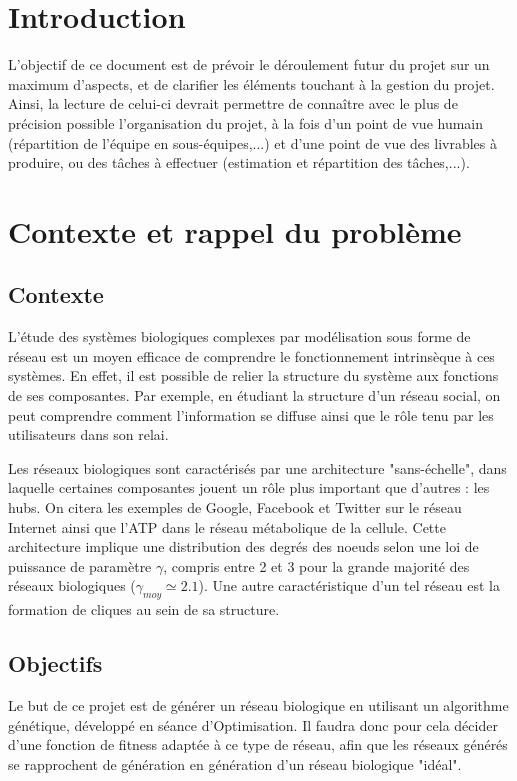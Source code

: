 


\maketitle

\section{Introduction}
L'objectif de ce document est de prévoir le déroulement futur du projet sur un maximum d'aspects, et de clarifier les éléments touchant à la gestion du projet. Ainsi, la lecture de celui-ci devrait permettre de connaître avec le plus de précision possible l'organisation du projet, à la fois d'un point de vue humain (répartition de l'équipe en sous-équipes,...) et d'une point de vue des livrables à produire, ou des tâches à effectuer (estimation et répartition des tâches,...).

\section{Contexte et rappel du problème}
\subsection{Contexte}
L'étude des systèmes biologiques complexes par modélisation sous forme de réseau est un moyen efficace de comprendre le fonctionnement intrinsèque à ces systèmes. En effet, il est possible de relier la structure du système aux fonctions de ses composantes. Par exemple, en étudiant la structure d'un réseau social, on peut comprendre comment l'information se diffuse ainsi que le rôle tenu par les utilisateurs dans son relai.

\medskip
Les réseaux biologiques sont caractérisés par une architecture "sans-échelle", dans laquelle certaines composantes jouent un rôle plus important que d'autres : les hubs. On citera les exemples de Google, Facebook et Twitter sur le réseau Internet ainsi que  l'ATP dans le réseau métabolique de la cellule. Cette architecture implique une distribution des degrés des noeuds selon une loi de puissance de paramètre $\gamma$, compris entre 2 et 3 pour la grande majorité des réseaux biologiques ($\gamma_{moy}\simeq 2.1$).
Une autre caractéristique d'un tel réseau est la formation de cliques au sein de sa structure. 

\subsection{Objectifs}
Le but de ce projet est de générer un réseau biologique en utilisant un algorithme génétique, développé en séance d'Optimisation. Il faudra donc pour cela décider d'une fonction de fitness adaptée à ce type de réseau, afin que les réseaux générés se rapprochent de génération en génération d'un réseau biologique "idéal".

